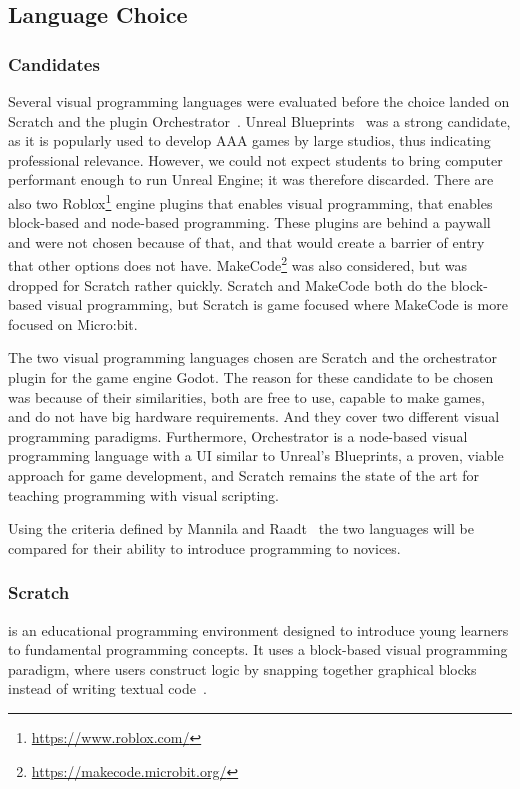 \subsection{Language Choice}\label{subsec:language-choice}

\subsubsection{Candidates}
Several visual programming languages were evaluated before the choice landed on Scratch and the plugin Orchestrator~\cite{orchestrator_docs_2026}.
Unreal Blueprints~\cite{epicgames_blueprints_2025} was a strong candidate, as it is popularly used to develop AAA games by large studios, thus indicating professional relevance.
However, we could not expect students to bring computer performant enough to run Unreal Engine; it was therefore discarded.
There are also two Roblox\footnote{\url{https://www.roblox.com/}} engine plugins that enables visual programming, that enables block-based and node-based programming.
These plugins are behind a paywall and were not chosen because of that, and that would create a barrier of entry that other options does not have.
MakeCode\footnote{{\url{https://makecode.microbit.org/}}} was also considered, but was dropped for Scratch rather quickly.
Scratch and MakeCode both do the block-based visual programming, but Scratch is game focused where MakeCode is more focused on Micro:bit.

The two visual programming languages chosen are Scratch and the orchestrator plugin for the game engine Godot.
The reason for these candidate to be chosen was because of their similarities, both are free to use, capable to make games, and do not have big hardware requirements.
And they cover two different visual programming paradigms.
Furthermore, Orchestrator is a node-based visual programming language with a UI similar to Unreal's Blueprints, a proven, viable approach for game development, and Scratch remains the state of the art for teaching programming with visual scripting.

Using the criteria defined by Mannila and Raadt~\cite{mannila_objective_2006} the two languages will be compared for their ability to introduce programming to novices.

\subsubsection{Scratch} is an educational programming environment designed to introduce young learners to fundamental programming concepts.
It uses a block-based visual programming paradigm, where users construct logic by snapping together graphical blocks instead of writing textual code~\cite{resnick_scratch_2009}.

